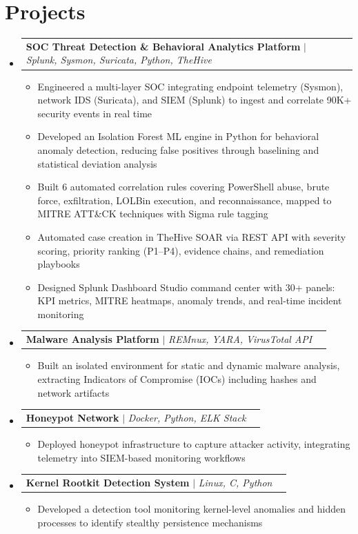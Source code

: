 \documentclass[letterpaper,10pt]{article}
\makeatletter
\newcommand{\resumeItem}[1]{
  \item\small{#1 \vspace{-2pt}}
}
\newcommand{\resumeProjectHeading}[2]{
    \item
    \begin{tabular*}{0.97\textwidth}{l@{\extracolsep{\fill}}r}
      \small#1 & #2 \\
    \end{tabular*}\vspace{-7pt}
}
\newcommand{\resumeSubHeadingListStart}{\begin{itemize}[leftmargin=0.15in, label={}]}
\newcommand{\resumeSubHeadingListEnd}{\end{itemize}}
\newcommand{\resumeItemListStart}{\begin{itemize}}
\newcommand{\resumeItemListEnd}{\end{itemize}\vspace{-5pt}}
\makeatother
\begin{document}
\section{Projects}
    \resumeSubHeadingListStart

      \resumeProjectHeading
          {\textbf{SOC Threat Detection \& Behavioral Analytics Platform} $|$ \emph{Splunk, Sysmon, Suricata, Python, TheHive}}{}
          \resumeItemListStart
            \resumeItem{Engineered a multi-layer SOC integrating endpoint telemetry (Sysmon), network IDS (Suricata), and SIEM (Splunk) to ingest and correlate 90K+ security events in real time}
            \resumeItem{Developed an Isolation Forest ML engine in Python for behavioral anomaly detection, reducing false positives through baselining and statistical deviation analysis}
            \resumeItem{Built 6 automated correlation rules covering PowerShell abuse, brute force, exfiltration, LOLBin execution, and reconnaissance, mapped to MITRE ATT\&CK techniques with Sigma rule tagging}
            \resumeItem{Automated case creation in TheHive SOAR via REST API with severity scoring, priority ranking (P1--P4), evidence chains, and remediation playbooks}
            \resumeItem{Designed Splunk Dashboard Studio command center with 30+ panels: KPI metrics, MITRE heatmaps, anomaly trends, and real-time incident monitoring}
          \resumeItemListEnd

      \resumeProjectHeading
          {\textbf{Malware Analysis Platform} $|$ \emph{REMnux, YARA, VirusTotal API}}{}
          \resumeItemListStart
            \resumeItem{Built an isolated environment for static and dynamic malware analysis, extracting Indicators of Compromise (IOCs) including hashes and network artifacts}
          \resumeItemListEnd

      \resumeProjectHeading
          {\textbf{Honeypot Network} $|$ \emph{Docker, Python, ELK Stack}}{}
          \resumeItemListStart
            \resumeItem{Deployed honeypot infrastructure to capture attacker activity, integrating telemetry into SIEM-based monitoring workflows}
          \resumeItemListEnd

      \resumeProjectHeading
          {\textbf{Kernel Rootkit Detection System} $|$ \emph{Linux, C, Python}}{}
          \resumeItemListStart
            \resumeItem{Developed a detection tool monitoring kernel-level anomalies and hidden processes to identify stealthy persistence mechanisms}
          \resumeItemListEnd

    \resumeSubHeadingListEnd
\end{document}
